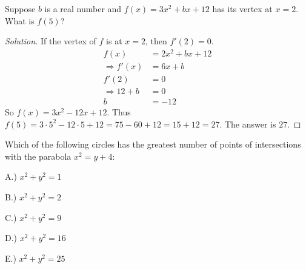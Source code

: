\documentclass[crop=false,class=book,oneside]{standalone}
\begin{document}
\begin{problem}
Suppose $b$ is a real number and $f(x) = 3x^2+bx+12$ has its vertex at $x=2$. What is $f(5)$?
\end{problem}
\begin{proof}[Solution]
If the vertex of $f$ is at $x=2$, then $f'(2) = 0$.
\begin{align*}
    f(x)&=2x^{2}+bx+12\\
    \Rightarrow f'(x)&=6x+b\\
    f'(2)&=0\\
    \Rightarrow 12 + b &= 0 \\
    b&=-12
\end{align*}
So $f(x) = 3x^2 -12 x + 12$. Thus $f(5) = 3\cdot 5^2 - 12\cdot 5 + 12 = 75 - 60 + 12 = 15 + 12 = 27$. The answer is $27$.
\end{proof}
\begin{problem}
Which of the following circles has the greatest number of points of intersections with the parabola $x^2 = y+4$:
\begin{enumerate}
\begin{multicols}{5}
    \item[A.)] $x^2+y^2 = 1$
    \item[B.)] $x^2+y^2 = 2$
    \item[C.)] $x^2+y^2 = 9$
    \item[D.)] $x^2+y^2 = 16$
    \item[E.)] $x^2+y^2=25$
\end{multicols}
\end{enumerate}
\end{problem}
\end{document}
